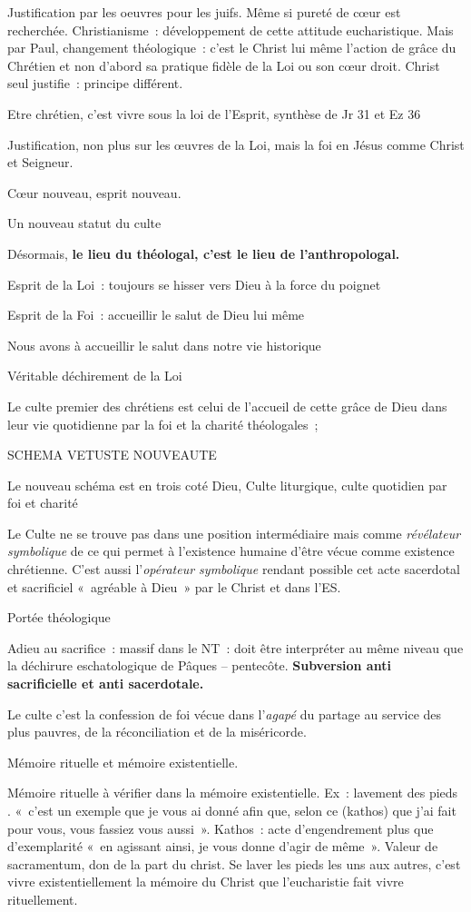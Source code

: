 Justification par les oeuvres pour les juifs. Même si pureté de cœur est
recherchée. Christianisme~: développement de cette attitude
eucharistique. Mais par Paul, changement théologique~: c'est le Christ
lui même l'action de grâce du Chrétien et non d'abord sa pratique fidèle
de la Loi ou son cœur droit. Christ seul justifie~: principe différent.

Etre chrétien, c'est vivre sous la loi de l'Esprit, synthèse de Jr 31 et
Ez 36

Justification, non plus sur les œuvres de la Loi, mais la foi en Jésus
comme Christ et Seigneur.

Cœur nouveau, esprit nouveau.

Un nouveau statut du culte

Désormais, \textbf{le lieu du théologal, c'est le lieu de
l'anthropologal.}

Esprit de la Loi~: toujours se hisser vers Dieu à la force du poignet

Esprit de la Foi~: accueillir le salut de Dieu lui même

Nous avons à accueillir le salut dans notre vie historique

Véritable déchirement de la Loi

Le culte premier des chrétiens est celui de l'accueil de cette grâce de
Dieu dans leur vie quotidienne par la foi et la charité théologales~;

SCHEMA VETUSTE NOUVEAUTE

Le nouveau schéma est en trois coté Dieu, Culte liturgique, culte
quotidien par foi et charité

Le Culte ne se trouve pas dans une position intermédiaire mais comme
\emph{révélateur symbolique} de ce qui permet à l'existence humaine
d'être vécue comme existence chrétienne. C'est aussi l'\emph{opérateur
symbolique} rendant possible cet acte sacerdotal et sacrificiel
«~agréable à Dieu~» par le Christ et dans l'ES.

Portée théologique

Adieu au sacrifice~: massif dans le NT~: doit être interpréter au même
niveau que la déchirure eschatologique de Pâques -- pentecôte.
\textbf{Subversion anti sacrificielle et anti sacerdotale.}

Le culte c'est la confession de foi vécue dans l'\emph{agapé} du partage
au service des plus pauvres, de la réconciliation et de la miséricorde.

Mémoire rituelle et mémoire existentielle.

Mémoire rituelle à vérifier dans la mémoire existentielle. Ex~: lavement
des pieds . «~c'est un exemple que je vous ai donné afin que, selon ce
(kathos) que j'ai fait pour vous, vous fassiez vous aussi~». Kathos~:
acte d'engendrement plus que d'exemplarité «~en agissant ainsi, je vous
donne d'agir de même~». Valeur de sacramentum, don de la part du christ.
Se laver les pieds les uns aux autres, c'est vivre existentiellement la
mémoire du Christ que l'eucharistie fait vivre rituellement.

